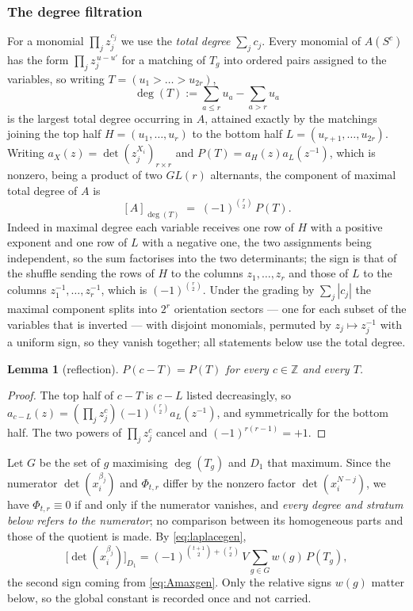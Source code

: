 \documentclass[11pt,reqno]{amsart}
\theoremstyle{plain}
\newtheorem{lemma}[theorem]{Lemma}
\theoremstyle{definition}
\newcommand{\ZZ}{\mathbb{Z}}
\begin{document}
\subsubsection*{The degree filtration}

For a monomial $\prod_j z_j^{c_j}$ we use the \emph{total degree} $\sum_j c_j$. Every monomial of
$A(S^{c})$ has the form $\prod_j z_j^{\,u-u'}$ for a matching of $T_g$ into ordered pairs assigned
to the variables, so writing $T=(u_1>\dots>u_{2r})$,
\begin{equation}\label{eq:deggen}
  \deg(T):=\sum_{a\le r}u_a-\sum_{a>r}u_a
\end{equation}
is the largest total degree occurring in $A$, attained exactly by the matchings joining the top half
$H=(u_1,\dots,u_r)$ to the bottom half $L=(u_{r+1},\dots,u_{2r})$. Writing
$a_X(z)=\det(z_j^{X_i})_{r\times r}$ and $P(T)=a_H(z)a_L(z^{-1})$, which is nonzero, being a product
of two $GL(r)$ alternants, the component of maximal total degree of $A$ is
\begin{equation}\label{eq:Amaxgen}
  [A]_{\deg(T)}\;=\;(-1)^{\binom r2}\,P(T).
\end{equation}
Indeed in maximal degree each variable receives one row of $H$ with a positive exponent and one row
of $L$ with a negative one, the two assignments being independent, so the sum factorises into the two
determinants; the sign is that of the shuffle sending the rows of $H$ to the columns
$z_1,\dots,z_r$ and those of $L$ to the columns $z_1^{-1},\dots,z_r^{-1}$, which is
$(-1)^{\binom r2}$. Under the
grading by $\sum_j|c_j|$ the maximal component splits into $2^{r}$ orientation sectors --- one for each subset of the
variables that is inverted --- with disjoint
monomials, permuted by $z_j\mapsto z_j^{-1}$ with a uniform sign, so they vanish together; all
statements below use the total degree.

\begin{lemma}[reflection]\label{lem:reflgen}
$P(c-T)=P(T)$ for every $c\in\ZZ$ and every $T$.
\end{lemma}

\begin{proof}
The top half of $c-T$ is $c-L$ listed decreasingly, so
$a_{c-L}(z)=(\prod_j z_j^{c})(-1)^{\binom r2}a_L(z^{-1})$, and symmetrically for the bottom half.
The two powers of $\prod_j z_j^{c}$ cancel and $(-1)^{r(r-1)}=+1$.
\end{proof}

Let $G$ be the set of $g$ maximising $\deg(T_g)$ and $D_1$ that maximum. Since the numerator
$\det(x_i^{\beta_j})$ and $\Phi_{t,r}$ differ by the nonzero factor $\det(x_i^{N-j})$, we have
$\Phi_{t,r}\equiv0$ if and only if the numerator vanishes, and \emph{every degree and stratum below
refers to the numerator}; no comparison between its homogeneous parts and those of the quotient is
made. By \eqref{eq:laplacegen},
\begin{equation}\label{eq:topgen}
  \bigl[\det(x_i^{\beta_j})\bigr]_{D_1}
  =(-1)^{\binom{t+1}{2}+\binom r2}\,V\sum_{g\in G}w(g)\,P(T_g),
\end{equation}
the second sign coming from \eqref{eq:Amaxgen}. Only the relative signs $w(g)$ matter below, so the
global constant is recorded once and not carried.
\end{document}
